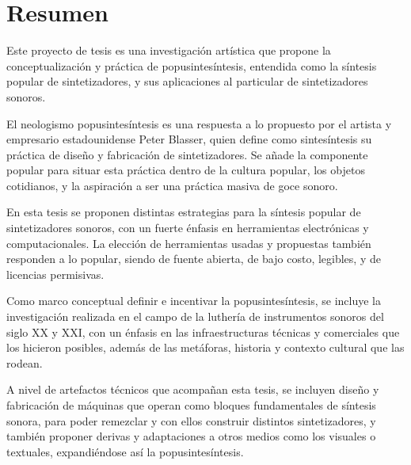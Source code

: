 \documentclass[../proyecto.tex]{subfiles}
\begin{document}
\chapter{Resumen}

Este proyecto de tesis es una investigación artística que propone la conceptualización y práctica de popusintesíntesis, entendida como la síntesis popular de sintetizadores, y sus aplicaciones al particular de sintetizadores sonoros.

El neologismo popusintesíntesis es una respuesta a lo propuesto por el artista y empresario estadounidense Peter Blasser, quien define como sintesíntesis su práctica de diseño y fabricación de sintetizadores. Se añade la componente popular para situar esta práctica dentro de la cultura popular, los objetos cotidianos, y la aspiración a ser una práctica masiva de goce sonoro.

En esta tesis se proponen distintas estrategias para la síntesis popular de sintetizadores sonoros, con un fuerte énfasis en herramientas electrónicas y computacionales. La elección de herramientas usadas y propuestas también responden a lo popular, siendo de fuente abierta, de bajo costo, legibles, y de licencias permisivas.

Como marco conceptual definir e incentivar la popusintesíntesis, se incluye la investigación realizada en el campo de la luthería de instrumentos sonoros del siglo XX y XXI, con un énfasis en las infraestructuras técnicas y comerciales que los hicieron posibles, además de las metáforas, historia y contexto cultural que las rodean.

A nivel de artefactos técnicos que acompañan esta tesis, se incluyen diseño y fabricación de máquinas que operan como bloques fundamentales de síntesis sonora, para poder remezclar y con ellos construir distintos sintetizadores, y también proponer derivas y adaptaciones a otros medios como los visuales o textuales, expandiéndose así la popusintesíntesis.

\end{document}
